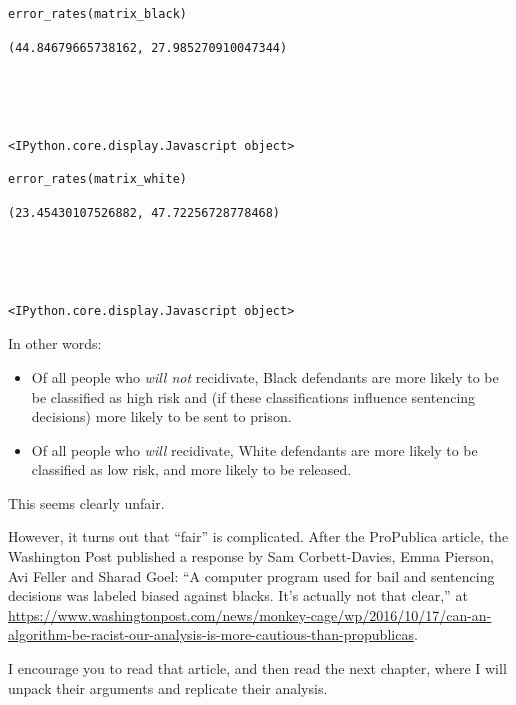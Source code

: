 \begin{lstlisting}[language=Python,style=source]
error_rates(matrix_black)
\end{lstlisting}

\begin{lstlisting}[style=output]
(44.84679665738162, 27.985270910047344)




<IPython.core.display.Javascript object>
\end{lstlisting}

\begin{lstlisting}[language=Python,style=source]
error_rates(matrix_white)
\end{lstlisting}

\begin{lstlisting}[style=output]
(23.45430107526882, 47.72256728778468)




<IPython.core.display.Javascript object>
\end{lstlisting}

In other words:

\begin{itemize}
\item
  Of all people who \emph{will not} recidivate, Black defendants are
  more likely to be be classified as high risk and (if these
  classifications influence sentencing decisions) more likely to be sent
  to prison.
\item
  Of all people who \emph{will} recidivate, White defendants are more
  likely to be classified as low risk, and more likely to be released.
\end{itemize}

This seems clearly unfair.

However, it turns out that ``fair'' is complicated. After the ProPublica
article, the Washington Post published a response by Sam Corbett-Davies,
Emma Pierson, Avi Feller and Sharad Goel: ``A computer program used for
bail and sentencing decisions was labeled biased against blacks. It's
actually not that clear,'' at
\url{https://www.washingtonpost.com/news/monkey-cage/wp/2016/10/17/can-an-algorithm-be-racist-our-analysis-is-more-cautious-than-propublicas}.

I encourage you to read that article, and then read the next chapter,
where I will unpack their arguments and replicate their analysis.

